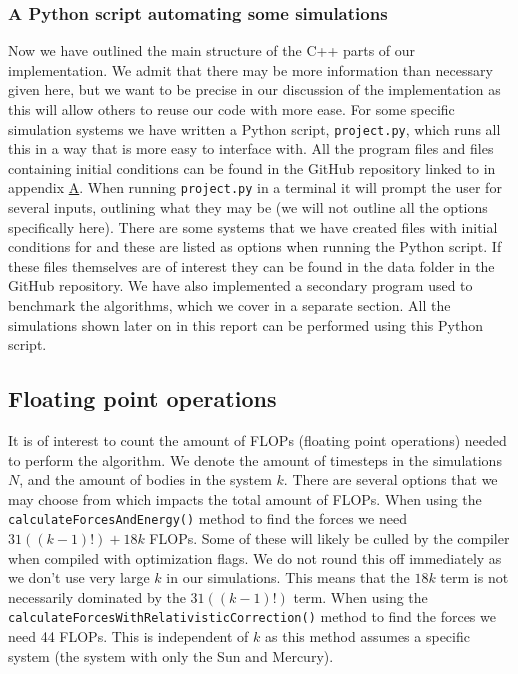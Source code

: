 \documentclass[reprint,english,notitlepage]{revtex4-1}  %
\begin{document}
\subsubsection{A Python script automating some simulations} \label{sec:III:a:5}

Now we have outlined the main structure of the C++ parts of our implementation. We admit that there may be more information than necessary given here, but we want to be precise in our discussion of the implementation as this will allow others to reuse our code with more ease. For some specific simulation systems we have written a Python script, \verb+project.py+, which runs all this in a way that is more easy to interface with. All the program files and files containing initial conditions can be found in the GitHub repository linked to in appendix \hyperref[A]{A}. When running \verb+project.py+ in a terminal it will prompt the user for several inputs, outlining what they may be (we will not outline all the options specifically here). There are some systems that we have created files with initial conditions for and these are listed as options when running the Python script. If these files themselves are of interest they can be found in the data folder in the GitHub repository. We have also implemented a secondary program used to benchmark the algorithms, which we cover in a separate section. All the simulations shown later on in this report can be performed using this Python script. 

\subsection{Floating point operations} \label{sec:III:b}

It is of interest to count the amount of FLOPs (floating point operations) needed to perform the algorithm. We denote the amount of timesteps in the simulations $N$, and the amount of bodies in the system $k$. There are several options that we may choose from which impacts the total amount of FLOPs. When using the \verb+calculateForcesAndEnergy()+ method to find the forces we need $31((k-1)!) + 18k$ FLOPs. Some of these will likely be culled by the compiler when compiled with optimization flags. We do not round this off immediately as we don't use very large $k$ in our simulations. This means that the $18k$ term is not necessarily dominated by the $31((k-1)!)$ term. When using the \verb+calculateForcesWithRelativisticCorrection()+ method to find the forces we need 44 FLOPs. This is independent of $k$ as this method assumes a specific system (the system with only the Sun and Mercury). 
\end{document}
